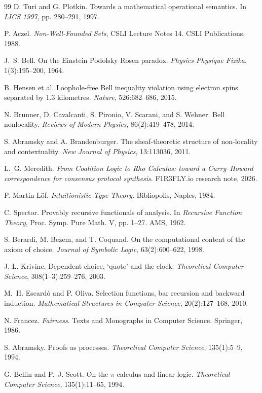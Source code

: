 \begin{thebibliography}{99}
D. Turi and G. Plotkin. Towards a mathematical operational semantics.
In \emph{LICS 1997}, pp. 280--291, 1997.

P. Aczel. \emph{Non-Well-Founded Sets}, CSLI Lecture Notes 14. CSLI Publications, 1988.

J.~S. Bell. On the Einstein Podolsky Rosen paradox.
\emph{Physics Physique Fizika}, 1(3):195--200, 1964.

B. Hensen et al. Loophole-free Bell inequality violation using electron spins separated
by 1.3 kilometres. \emph{Nature}, 526:682--686, 2015.

N. Brunner, D. Cavalcanti, S. Pironio, V. Scarani, and S. Wehner. Bell nonlocality.
\emph{Reviews of Modern Physics}, 86(2):419--478, 2014.

S. Abramsky and A. Brandenburger. The sheaf-theoretic structure of non-locality and
contextuality. \emph{New Journal of Physics}, 13:113036, 2011.


L.~G. Meredith. \emph{From Coalition Logic to Rho Calculus: toward a Curry--Howard
correspondence for consensus protocol synthesis}. F1R3FLY.io research note, 2026.

P. Martin-L\"of. \emph{Intuitionistic Type Theory}. Bibliopolis, Naples, 1984.

C. Spector. Provably recursive functionals of analysis. In \emph{Recursive Function
Theory}, Proc. Symp. Pure Math. V, pp. 1--27. AMS, 1962.

S. Berardi, M. Bezem, and T. Coquand. On the computational content of the axiom of
choice. \emph{Journal of Symbolic Logic}, 63(2):600--622, 1998.

J.-L. Krivine. Dependent choice, `quote' and the clock.
\emph{Theoretical Computer Science}, 308(1--3):259--276, 2003.

M.~H. Escard\'o and P. Oliva. Selection functions, bar recursion and backward
induction. \emph{Mathematical Structures in Computer Science}, 20(2):127--168, 2010.

N. Francez. \emph{Fairness}. Texts and Monographs in Computer Science. Springer, 1986.

S. Abramsky. Proofs as processes. \emph{Theoretical Computer Science},
135(1):5--9, 1994.

G. Bellin and P.~J. Scott. On the $\pi$-calculus and linear logic.
\emph{Theoretical Computer Science}, 135(1):11--65, 1994.


\end{thebibliography}
